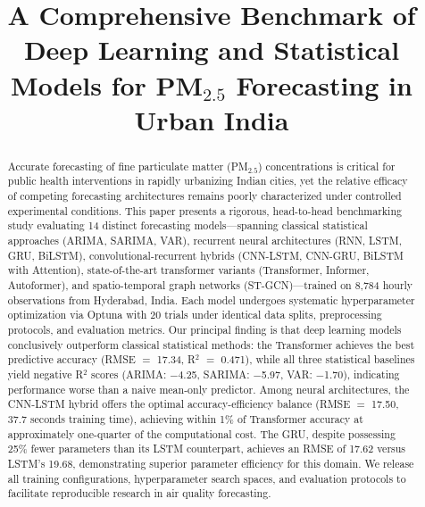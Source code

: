 \documentclass[conference]{IEEEtran}
\begin{document}
\title{A Comprehensive Benchmark of Deep Learning and Statistical Models for PM$_{2.5}$ Forecasting in Urban India}

\author{
}

\maketitle

\begin{abstract}
Accurate forecasting of fine particulate matter (PM$_{2.5}$) concentrations is critical for public health interventions in rapidly urbanizing Indian cities, yet the relative efficacy of competing forecasting architectures remains poorly characterized under controlled experimental conditions. This paper presents a rigorous, head-to-head benchmarking study evaluating 14 distinct forecasting models---spanning classical statistical approaches (ARIMA, SARIMA, VAR), recurrent neural architectures (RNN, LSTM, GRU, BiLSTM), convolutional-recurrent hybrids (CNN-LSTM, CNN-GRU, BiLSTM with Attention), state-of-the-art transformer variants (Transformer, Informer, Autoformer), and spatio-temporal graph networks (ST-GCN)---trained on 8,784 hourly observations from Hyderabad, India. Each model undergoes systematic hyperparameter optimization via Optuna with 20 trials under identical data splits, preprocessing protocols, and evaluation metrics. Our principal finding is that deep learning models conclusively outperform classical statistical methods: the Transformer achieves the best predictive accuracy (RMSE $=$ 17.34, R$^{2}$ $=$ 0.471), while all three statistical baselines yield negative R$^{2}$ scores (ARIMA: $-$4.25, SARIMA: $-$5.97, VAR: $-$1.70), indicating performance worse than a naive mean-only predictor. Among neural architectures, the CNN-LSTM hybrid offers the optimal accuracy-efficiency balance (RMSE $=$ 17.50, 37.7 seconds training time), achieving within 1\% of Transformer accuracy at approximately one-quarter of the computational cost. The GRU, despite possessing 25\% fewer parameters than its LSTM counterpart, achieves an RMSE of 17.62 versus LSTM's 19.68, demonstrating superior parameter efficiency for this domain. We release all training configurations, hyperparameter search spaces, and evaluation protocols to facilitate reproducible research in air quality forecasting.
\end{abstract}
\end{document}

